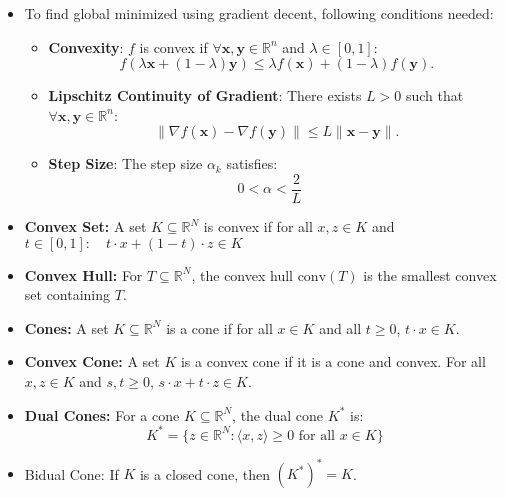 \documentclass{article}
\begin{document}
\begin{itemize}

\item To find global minimized using gradient decent, following conditions needed:

\begin{itemize}
   \item \textbf{Convexity}: \( f \) is convex if \(\forall \mathbf{x}, \mathbf{y} \in \mathbb{R}^n \) and \( \lambda \in [0,1] \):
   \[
   f(\lambda \mathbf{x} + (1 - \lambda) \mathbf{y}) \leq \lambda f(\mathbf{x}) + (1 - \lambda) f(\mathbf{y}).
   \]

\item \textbf{Lipschitz Continuity of Gradient}: There exists \( L > 0 \) such that \(\forall \mathbf{x}, \mathbf{y} \in \mathbb{R}^n \):
   \[
   \| \nabla f(\mathbf{x}) - \nabla f(\mathbf{y}) \| \leq L \| \mathbf{x} - \mathbf{y} \|.
   \]

\item \textbf{Step Size}: The step size \( \alpha_k \) satisfies:
   \[
   0 < \alpha < \frac{2}{L} \quad 
   \]
\end{itemize}



 \item \textbf{Convex Set:} A set \( K \subseteq \mathbb{R}^N \) is convex if for all \( x, z \in K \) and \( t \in [0, 1]: \quad t \cdot x + (1 - t) \cdot z \in K \)

 \item \textbf{Convex Hull:} For \( T \subseteq \mathbb{R}^N \), the convex hull \( \text{conv}(T) \) is the smallest convex set containing \( T \).


\item \textbf{Cones:} A set $K \subseteq \mathbb{R}^N$ is a cone if for all $x \in K$ and all $t \geq 0$, $t \cdot x \in K$.


\item \textbf{Convex Cone:} A set $K$ is a convex cone if it is a cone and convex. For all $x,z \in K$ and $s, t \geq 0$, $s \cdot x + t \cdot z \in K$.

\item \textbf{Dual Cones:} For a cone $K \subseteq \mathbb{R}^N$, the dual cone $K^*$ is:
    \[
    K^* = \{z \in \mathbb{R}^N : \langle x, z \rangle \geq 0 \text{ for all } x \in K\}
    \]

\item Bidual Cone: If $K$ is a closed cone, then $(K^*)^* = K$.


\end{itemize}
\end{document}

